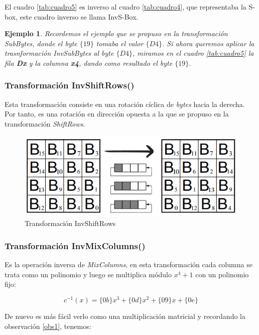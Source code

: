\documentclass[peerreview]{IEEEtran}
\newtheorem{ejem}{\textbf{Ejemplo}}
\begin{document}
El cuadro \ref{tab:cuadro5} es inverso al cuadro \ref{tab:cuadro4}, que representaba la S-box, este cuadro inverso se llama InvS-Box.\\

\begin{ejem}
	Recordemos el ejemplo que se propuso en la transformación \textit{SubBytes}, donde el byte $\{19\}$ tomaba el valor $\{D4\}$. Si ahora queremos aplicar la trasnformación \textit{InvSubBytes} al byte $\{D4\}$, miramos en el cuadro \ref{tab:cuadro5} la fila \textbf{Dx} y la columna \textbf{x4}, dando como resultado el byte $\{19\}$.
\end{ejem}

\subsubsection{Transformación InvShiftRows()}
 Esta transformación consiste en una rotación cíclica de \textit{bytes} hacia la derecha. Por tanto, es una rotación en dirección opuesta a la que se propuso en la transformación \textit{ShiftRows}.
\begin{figure}[h]
	\includegraphics[scale=0.65]{figuras/InvShiftRows.png}
	\centering
	\caption{Transformación InvShiftRows}
	\label{fig: 8}
\end{figure}

\subsubsection{Transformación InvMixColumns()}
Es la operación inversa de \textit{MixColumns}, en esta transformación cada columna se trata como un polinomio y luego se multiplica módulo $x^4 + 1$ con un polinomio fijo:

\[c^{-1}(x)=\{0b\}x^3 + \{0d\}x^2 + \{09\}x + \{0e\}\]

De nuevo es más fácil verlo como una multiplicación matricial y recordando la observación \ref{obs1}, tenemos: \\
\end{document}
